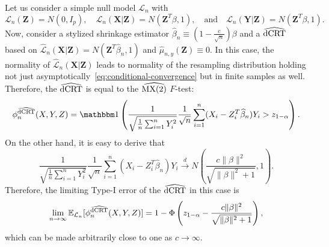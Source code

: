 \documentclass[12pt]{article}
\theoremstyle{definition}
\theoremstyle{remark}
\newcommand{\E}{\mathbb E}								%
\newcommand{\indicator}{\mathbbm 1}						%
\newcommand{\convd}{\overset d \rightarrow}             %
\newcommand{\prx}{\bm X}								%
\newcommand{\srx}{X}									%
\newcommand{\prz}{\bm Z}								%
\newcommand{\srz}{Z}									%
\newcommand{\pry}{{\bm Y}}								%
\newcommand{\sry}{Y}									%
\newcommand{\law}{\mathcal L}							%
\newcommand{\lawhat}{\widehat{\mathcal L}}				%
\newcommand{\dCRThat}{\widehat{\textnormal{dCRT}}}		%
\newcommand{\MXtwohat}{\widehat{\textnormal{MX(2)}}}		%
\begin{document}
	Let us consider a simple null model $\law_n$ with
	\begin{equation}
		\law_n(\prz) = N(0, I_p), \quad \law_n(\prx|\prz) = N(\prz^T \beta, 1), \quad \text{and} \quad \law_n(\pry|\prz) = N(\prz^T \beta, 1).
		\label{eq:simple-null-model}
	\end{equation}
	Now, consider a stylized shrinkage estimator $\widehat \beta_n \equiv (1-\frac{c}{\sqrt{n}}) \beta$ and a $\dCRThat$ based on $\lawhat_n(\prx|\prz) = N(\prz^T \widehat \beta_n, 1)$ and  $\widehat \mu_{n,y}(\prz) \equiv 0$. In this case, the normality of $\lawhat_n(\prx|\prz)$ leads to normality of the resampling distribution holding not just asymptotically~\eqref{eq:conditional-convergence} but in finite samples as well. Therefore, the $\dCRThat$ is equal to the $\MXtwohat$ $F$-test:
	\begin{equation}
		\phi^{\dCRThat}_{n}(\srx, \sry, \srz) = \indicator\left(\frac{1}{\sqrt{\frac{1}{n}\sum_{i = 1}^n \sry_i^2}}\frac{1}{\sqrt n}\sum_{i = 1}^n (\srx_i - \srz_i^T \widehat \beta_n)\sry_i > z_{1-\alpha}\right).
	\end{equation}
	On the other hand, it is easy to derive that
	\begin{equation}
		\frac{1}{\sqrt{\frac{1}{n}\sum_{i = 1}^n \sry_i^2}}\frac{1}{\sqrt n}\sum_{i = 1}^n (\srx_i - \srz_i^T \widehat \beta_n)\sry_i \convd N\left(\frac{c\|\beta\|^2}{\sqrt{\|\beta\|^2+1}}, 1\right).
	\end{equation}
	Therefore, the limiting Type-I error of the $\dCRThat$ in this case is
	\begin{equation}
		\lim_{n \rightarrow \infty}\E_{\law_n}[\phi^{\dCRThat}_{n}(\srx, \sry, \srz)] = 1-\Phi\left(z_{1-\alpha} -\frac{c\|\beta\|^2}{\sqrt{\|\beta\|^2+1}}\right),
	\end{equation}
	which can be made arbitrarily close to one as $c \rightarrow \infty$. 
	
\end{document}

